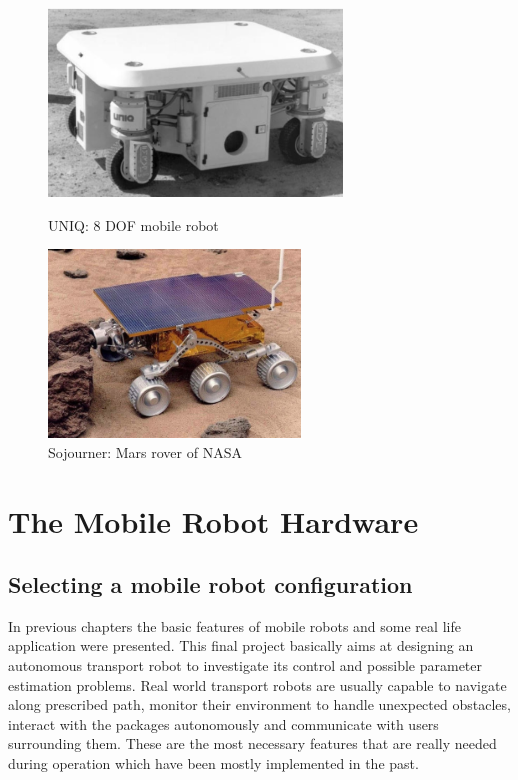 \documentclass[12pt,english]{article}
\begin{document}
\begin{figure}[htb!]
	\centering
	\centering
	\includegraphics[height=5cm]{figures/uniq.png}
	\caption{UNIQ: 8 DOF mobile robot}
	\endminipage\hfill
	\centering
	\includegraphics[height=5cm]{figures/rover.png}
	\caption{Sojourner: Mars rover of NASA}
	\label{mecanum}
	\endminipage\hfill
\end{figure}

\newpage
\section{The Mobile Robot Hardware}
\subsection{Selecting a mobile robot configuration}
In previous chapters the basic features of mobile robots and some real life application were presented. This final project basically aims at designing an autonomous transport robot to investigate its control and possible parameter estimation problems. Real world transport robots are usually capable to navigate along prescribed path, monitor their environment to handle unexpected obstacles, interact with the packages autonomously and communicate with users surrounding them. These are the most necessary features that are really needed during operation which have been mostly implemented in the past.
\end{document}
